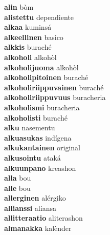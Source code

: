 \textbf{alin } bòm \\
\textbf{alistettu } dependiente \\
\textbf{alkaa } kuminsá \\
\textbf{alkeellinen } basico \\
\textbf{alkkis } buraché \\
\textbf{alkoholi } alkohòl \\
\textbf{alkoholijuoma } alkohòl \\
\textbf{alkoholipitoinen } buraché \\
\textbf{alkoholiriippuvainen } buraché \\
\textbf{alkoholiriippuvuus } buracheria \\
\textbf{alkoholismi } buracheria \\
\textbf{alkoholisti } buraché \\
\textbf{alku } nasementu \\
\textbf{alkuasukas } indígena \\
\textbf{alkukantainen } original \\
\textbf{alkusointu } ataká \\
\textbf{alkuunpano } kreashon \\
\textbf{alla } bou \\
\textbf{alle } bou \\
\textbf{allerginen } alérgiko \\
\textbf{allianssi } aliansa \\
\textbf{allitteraatio } aliterashon \\
\textbf{almanakka } kalènder \\

